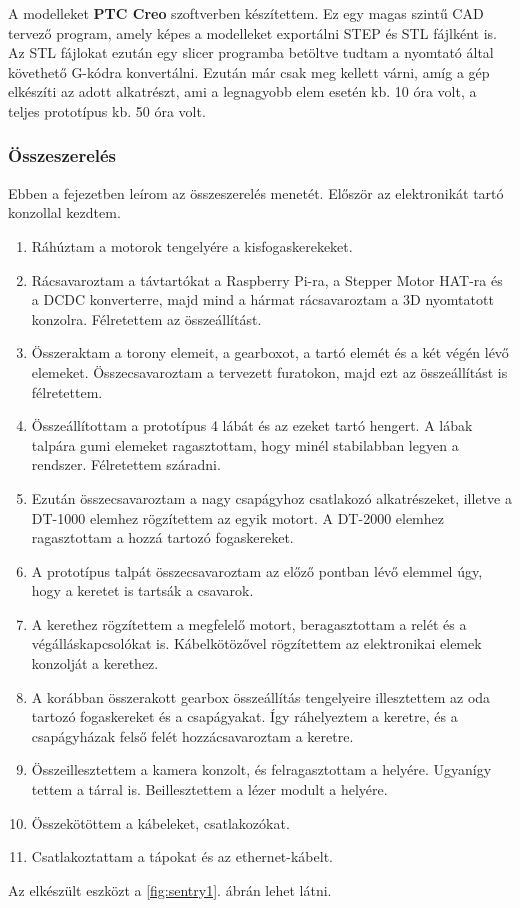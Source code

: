 \documentclass[12pt,a4paper]{article}
\begin{document}
A modelleket \textbf{PTC Creo} szoftverben készítettem. Ez egy magas szintű CAD tervező program, amely képes a modelleket exportálni STEP és STL fájlként is. Az STL fájlokat ezután egy slicer programba betöltve tudtam a nyomtató által követhető G-kódra konvertálni. Ezután már csak meg kellett várni, amíg a gép elkészíti az adott alkatrészt, ami a legnagyobb elem esetén kb. 10 óra volt, a teljes prototípus kb. 50 óra volt.

\pagebreak
\subsubsection{Összeszerelés}

Ebben a fejezetben leírom az összeszerelés menetét. Először az elektronikát tartó konzollal kezdtem.

\begin{enumerate}
	\item Ráhúztam a motorok tengelyére a kisfogaskerekeket. 
	\item Rácsavaroztam a távtartókat a Raspberry Pi-ra, a Stepper Motor HAT-ra és a DCDC konverterre, majd mind a hármat rácsavaroztam a 3D nyomtatott konzolra. Félretettem az összeállítást.
	\item Összeraktam a torony elemeit, a gearboxot, a tartó elemét és a két végén lévő elemeket. Összecsavaroztam a tervezett furatokon, majd ezt az összeállítást is félretettem. 
	\item Összeállítottam a prototípus 4 lábát és az ezeket tartó hengert. A lábak talpára gumi elemeket ragasztottam, hogy minél stabilabban legyen a rendszer. Félretettem száradni.
	\item Ezután összecsavaroztam a nagy csapágyhoz csatlakozó alkatrészeket, illetve a DT-1000 elemhez rögzítettem az egyik motort. A DT-2000 elemhez ragasztottam a hozzá tartozó fogaskereket.
	\item A prototípus talpát összecsavaroztam az előző pontban lévő elemmel úgy, hogy a keretet is tartsák a csavarok.
	\item A kerethez rögzítettem a megfelelő motort, beragasztottam a relét és a végálláskapcsolókat is. Kábelkötözővel rögzítettem az elektronikai elemek konzolját a kerethez.
	\item A korábban összerakott gearbox összeállítás tengelyeire illesztettem az oda tartozó fogaskereket és a csapágyakat. Így ráhelyeztem a keretre, és a csapágyházak felső felét hozzácsavaroztam a keretre. 
	\item Összeillesztettem a kamera konzolt, és felragasztottam a helyére. Ugyanígy tettem a tárral is. Beillesztettem a lézer modult a helyére.
	\item Összekötöttem a kábeleket, csatlakozókat.
	\item Csatlakoztattam a tápokat és az ethernet-kábelt.
\end{enumerate}
Az elkészült eszközt a \ref{fig:sentry1}. ábrán lehet látni.
\pagebreak
\end{document}
